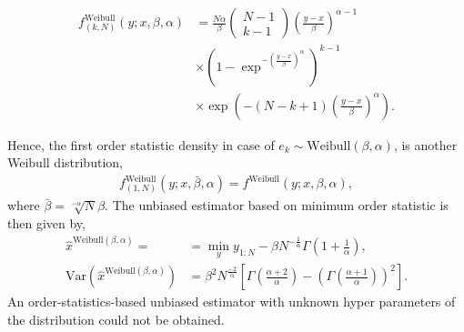 \documentclass[journal]{IEEEtran}
\newcommand{\Var}{\mathrm{Var}}
\begin{document}
%
%
\begin{align}
f^{\mathrm{Weibull}}_{(k,N)}(y;x,\beta,\alpha) &= \frac{N\alpha}{\beta}\begin{pmatrix}N-1\\k-1\end{pmatrix}(\frac{y-x}{\beta})^{\alpha-1}\nonumber\\&\times\left(1-\exp^{-(\frac{y-x}{\beta})^\alpha}\right)^{k-1}\nonumber\\&\times\exp\left(-(N-k+1)(\frac{y-x}{\beta})^\alpha\right).
\label{eq:weibull_order}
\end{align}
%
%

%
%
Hence, the first order statistic density in case of $e_k\sim\mathrm{Weibull}(\beta,\alpha)$, is another Weibull distribution,
%
%
\begin{align}
f^{\mathrm{Weibull}}_{(1,N)}(y;x,\bar{\beta},\alpha) = f^{\mathrm{Weibull}}(y;x,\beta,\alpha),
\end{align}
%
%
where $\bar{\beta}=\sqrt[-\alpha]{N}\beta$. The unbiased estimator based on minimum order statistic is then given by,
%
%
\begin{subequations}
\begin{align}
\hat{x}^{\mathrm{Weibull}(\beta,\alpha)} = &= \min_y y_{1:N} - \beta N^{-\frac{1}{\alpha}}\Gamma(1+\frac{1}{\alpha}),
\\
\Var(\hat{x}^{\mathrm{Weibull}(\beta,\alpha)}) &=\beta^2N^{\frac{-2}{\alpha}}\left[\Gamma(\frac{\alpha+2}{\alpha})-\left(\Gamma(\frac{\alpha+1}{\alpha})\right)^2\right].
\end{align}
\end{subequations}
%
%
An order-statistics-based unbiased estimator with unknown hyper parameters of the distribution could not be obtained.
\end{document}
